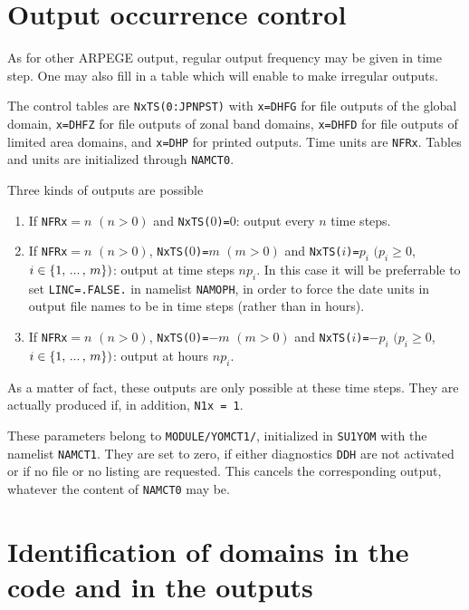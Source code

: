 \section{Output occurrence control}

As for other ARPEGE output, regular output frequency may be given in time step. One may also fill in a table which will enable to make irregular outputs.

\noi The control tables are {\tt NxTS(0:JPNPST)} with {\tt x=DHFG} for file outputs of the global domain, 
{\tt x=DHFZ} for file outputs of zonal band domains,
{\tt x=DHFD} for file outputs of limited area domains,
and {\tt x=DHP} for printed outputs.
\newline\noindent Time units are {\tt NFRx}. 
\newline\noindent Tables and units are initialized through {\tt NAMCT0}.

\ms
Three kinds of outputs are possible
\begin{enumerate}
        \item If {\tt NFRx}$=n$ $(n>0)$ and {\tt NxTS(}$0${\tt )=}$0$:
              output every $n$ time steps.
        \item If {\tt NFRx}$=n$ $(n>0)$, {\tt NxTS(}$0${\tt )=}$m$ $(m>0)$
              and {\tt NxTS(}$i${\tt )=}$p_{i}$ $(p_{i}\ge 0$, $i\in\left\{ 1,\,...\,,\, m\right\})$:
              output at time steps $n p_{i}$. In this case it will be preferrable to set
		    {\tt LINC=.FALSE.} in namelist 
		    {\tt NAMOPH}, in order to force the date units in output file names to be in time steps (rather than in hours).
        \item If {\tt NFRx}$=n$ $(n>0)$, {\tt NxTS(}$0${\tt )=}$-m$ $(m>0)$
              and {\tt NxTS(}$i${\tt )=}$-p_{i}$ $(p_{i}\ge 0$, $i\in\left\{ 1,\,...\,,\, m\right\})$:
              output at hours $n p_{i}$.
\end{enumerate}

As a matter of fact, these outputs are only possible at these time steps. They are actually produced if, in addition, {\tt N1x = 1}.

These parameters belong to {\tt MODULE/YOMCT1/}, initialized in {\tt SU1YOM} with the namelist {\tt NAMCT1}. They are set to zero, if either diagnostics {\tt DDH} are not activated or if no file or no listing are requested. This cancels the corresponding output, whatever the content of {\tt NAMCT0} may be.

\section{Identification of domains in the code and in the outputs}

